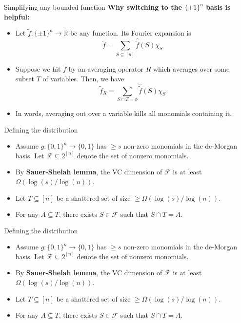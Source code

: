\begin{frame}{Simplifying any bounded function}
\textbf{Why switching to the $\{ \pm 1 \}^n$ basis is helpful:}
\begin{itemize}
	\item<1-> Let $\tilde{f}: \{ \pm 1\}^n \rightarrow \mathbb{R}$ be any function. Its Fourier expansion is
	$$ \tilde{f} = \displaystyle \sum_{S \subseteq [n]} \hat{\tilde{f}}(S) \chi_S$$
	\item<2-> Suppose we hit $\tilde{f}$ by an averaging operator $R$ which averages over some subset $T$ of variables. Then, we have
	$$ \tilde{f}_R = \displaystyle \sum_{S \cap T = \phi} \hat{\tilde{f}}(S) \chi_S$$
	\item<3->In words, averaging out over a variable kills all monomials containing it.
\end{itemize}
\end{frame}

\begin{frame}{Defining the distribution}

\begin{itemize}
	\item<1-> Assume $g: \{0,1\}^n \rightarrow \{0,1\}$ has $\geq s$ non-zero monomials in the de-Morgan basis. Let $\mathcal{F} \subseteq 2^{[n]}$ denote the set of nonzero monomials. 
	\item<2-> By \textbf{Sauer-Shelah lemma}, the VC dimension of $\mathcal{F}$ is at least $\Omega (\log(s)/\log(n))$.
	\item<3-> Let $T \subseteq [n]$ be a shattered set of size $\geq \Omega(\log(s)/\log(n))$.
	\item<4-> For any $A \subseteq T$, there exists $S \in \mathcal{F}$ such that $S \cap T = A$.
\end{itemize}

\end{frame}


\begin{frame}{Defining the distribution}
	
	\begin{itemize}
		\item<1-> Assume $g: \{0,1\}^n \rightarrow \{0,1\}$ has $\geq s$ non-zero monomials in the de-Morgan basis. Let $\mathcal{F} \subseteq 2^{[n]}$ denote the set of nonzero monomials. 
		\item<2-> By \textbf{Sauer-Shelah lemma}, the VC dimension of $\mathcal{F}$ is at least $\Omega (\log(s)/\log(n))$.
		\item<3-> Let $T \subseteq [n]$ be a shattered set of size $\geq \Omega(\log(s)/\log(n))$.
		\item<4-> For any $A \subseteq T$, there exists $S \in \mathcal{F}$ such that $S \cap T = A$.
	\end{itemize}
	
\end{frame}


